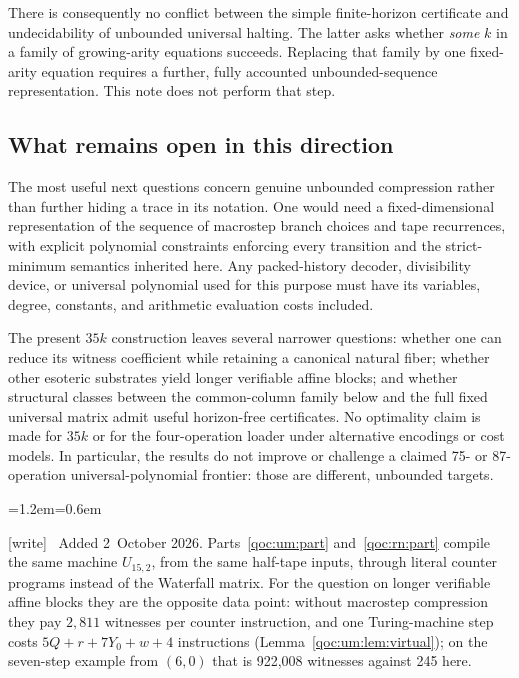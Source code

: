 \documentclass[11pt,letterpaper]{article}
\theoremstyle{definition}
\theoremstyle{remark}
\newcommand{\wtag}{\textup{[write]}}
\newenvironment{writenote}{\par\smallskip\begin{list}{}{\leftmargin=1.2em\rightmargin=0.6em}\item[]\small\wtag\ }{\end{list}\smallskip}
\begin{document}
There is consequently no conflict between the simple finite-horizon certificate and undecidability of unbounded universal halting. The latter asks whether \emph{some} $k$ in a family of growing-arity equations succeeds. Replacing that family by one fixed-arity equation requires a further, fully accounted unbounded-sequence representation. This note does not perform that step.

\subsection{What remains open in this direction}
The most useful next questions concern genuine unbounded compression rather than further hiding a trace in its notation. One would need a fixed-dimensional representation of the sequence of macrostep branch choices and tape recurrences, with explicit polynomial constraints enforcing every transition and the strict-minimum semantics inherited here. Any packed-history decoder, divisibility device, or universal polynomial used for this purpose must have its variables, degree, constants, and arithmetic evaluation costs included.

The present $35k$ construction leaves several narrower questions: whether one can reduce its witness coefficient while retaining a canonical natural fiber; whether other esoteric substrates yield longer verifiable affine blocks; and whether structural classes between the common-column family below and the full fixed universal matrix admit useful horizon-free certificates. No optimality claim is made for $35k$ or for the four-operation loader under alternative encodings or cost models. In particular, the results do not improve or challenge a claimed 75- or 87-operation universal-polynomial frontier: those are different, unbounded targets.
\begin{writenote}
Added 2~October 2026. Parts~\ref{qoc:um:part} and~\ref{qoc:rn:part} compile the same machine $U_{15,2}$, from the same half-tape inputs, through literal counter programs instead of the Waterfall matrix. For the question on longer verifiable affine blocks they are the opposite data point: without macrostep compression they pay $2{,}811$ witnesses per counter instruction, and one Turing-machine step costs $5Q+r+7Y_0+w+4$ instructions (Lemma~\ref{qoc:um:lem:virtual}); on the seven-step example from $(6,0)$ that is 922,008 witnesses against 245 here.
\end{writenote}
\end{document}
